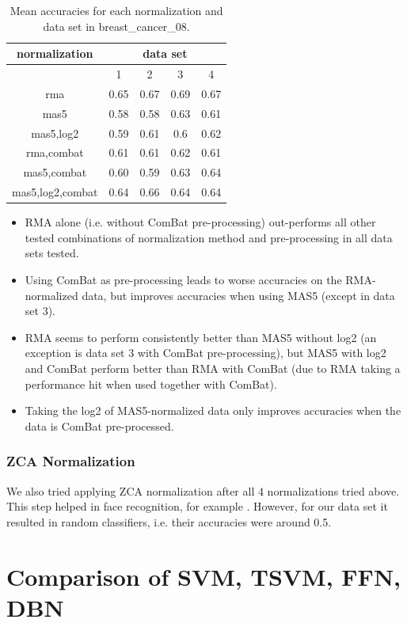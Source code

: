 \begin{table}
\begin{centering}
\begin{tabular}{|c||c|c|c|c|}
\hline 
normalization & \multicolumn{4}{c|}{data set}\tabularnewline
\hline 
 & 1 & 2 & 3 & 4\tabularnewline
\hline 
\hline 
rma & 0.65 & 0.67 & 0.69 & 0.67\tabularnewline
\hline 
mas5 & 0.58 & 0.58 & 0.63 & 0.61\tabularnewline
\hline 
mas5,log2 & 0.59 & 0.61 & 0.6 & 0.62\tabularnewline
\hline 
rma,combat & 0.61 & 0.61 & 0.62 & 0.61\tabularnewline
\hline 
mas5,combat & 0.60 & 0.59 & 0.63 & 0.64\tabularnewline
\hline 
mas5,log2,combat & 0.64 & 0.66 & 0.64 & 0.64\tabularnewline
\hline 
\end{tabular}
\par\end{centering}
\caption{\label{tab:Mean-accuracies-for-each-normalization}Mean accuracies
for each normalization and data set in breast\_cancer\_08.}
\end{table}
\begin{itemize}
\item RMA alone (i.e. without ComBat pre-processing) out-performs all other
tested combinations of normalization method and pre-processing in
all data sets tested.
\item Using ComBat as pre-processing leads to worse accuracies on the RMA-normalized
data, but improves accuracies when using MAS5 (except in data set
3).
\item RMA seems to perform consistently better than MAS5 without log2 (an
exception is data set 3 with ComBat pre-processing), but MAS5 with
log2 and ComBat perform better than RMA with ComBat (due to RMA taking
a performance hit when used together with ComBat).
\item Taking the log2 of MAS5-normalized data only improves accuracies when
the data is ComBat pre-processed.
\end{itemize}

\subsubsection{ZCA Normalization}

We also tried applying ZCA normalization after all 4 normalizations
tried above. This step helped in face recognition, for example \cite{KrizhevskyHinton2009}.
However, for our data set it resulted in random classifiers, i.e.
their accuracies were around 0.5.


\section{Comparison of SVM, TSVM, FFN, DBN\label{sec:breast_cancer_12}}

